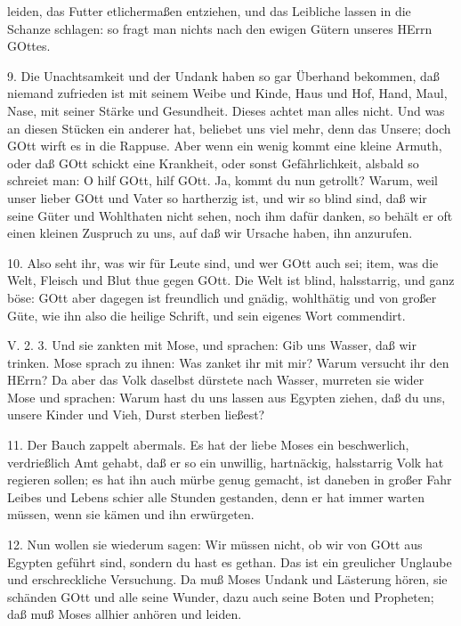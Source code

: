 leiden, das Futter etlichermaßen entziehen, und das Leibliche lassen in die Schanze schlagen: so fragt man nichts nach den ewigen Gütern unseres HErrn GOttes.

9. Die Unachtsamkeit und der Undank haben so gar Überhand bekommen, daß niemand zufrieden ist mit seinem Weibe und Kinde, Haus und Hof, Hand, Maul, Nase, mit seiner Stärke und Gesundheit. Dieses achtet man alles nicht. Und was an diesen Stücken ein anderer hat, beliebet uns viel mehr, denn das Unsere; doch GOtt wirft es in die Rappuse. Aber wenn ein wenig kommt eine kleine Armuth, oder daß GOtt schickt eine Krankheit, oder sonst Gefährlichkeit, alsbald so schreiet man: O hilf GOtt, hilf GOtt. Ja, kommt du nun getrollt? Warum, weil unser lieber GOtt und Vater so hartherzig ist, und wir so blind sind, daß wir seine Güter und Wohlthaten nicht sehen, noch ihm dafür danken, so behält er oft einen kleinen Zuspruch zu uns, auf daß wir Ursache haben, ihn anzurufen.

10. Also seht ihr, was wir für Leute sind, und wer GOtt auch sei; item, was die Welt, Fleisch und Blut thue gegen GOtt. Die Welt ist blind, halsstarrig, und ganz böse: GOtt aber dagegen ist freundlich und gnädig, wohlthätig und von großer Güte, wie ihn also die heilige Schrift, und sein eigenes Wort commendirt.

\begin{schriftzitat}
V. 2. 3. Und sie zankten mit Mose, und sprachen: Gib uns Wasser, daß wir trinken. Mose sprach zu ihnen: Was zanket ihr mit mir? Warum versucht ihr den HErrn? Da aber das Volk daselbst dürstete nach Wasser, murreten sie wider Mose und sprachen: Warum hast du uns lassen aus Egypten ziehen, daß du uns, unsere Kinder und Vieh, Durst sterben ließest?
\end{schriftzitat}

11. Der Bauch zappelt abermals. Es hat der liebe Moses ein beschwerlich, verdrießlich Amt gehabt, daß er so ein unwillig, hartnäckig, halsstarrig Volk hat regieren sollen; es hat ihn auch mürbe genug gemacht, ist daneben in großer Fahr Leibes und Lebens schier alle Stunden gestanden, denn er hat immer warten müssen, wenn sie kämen und ihn erwürgeten.

12. Nun wollen sie wiederum sagen: Wir müssen nicht, ob wir von GOtt aus Egypten geführt sind, sondern du hast es gethan. Das ist ein greulicher Unglaube und erschreckliche Versuchung. Da muß Moses Undank und Lästerung hören, sie schänden GOtt und alle seine
Wunder, dazu auch seine Boten und Propheten; daß muß Moses allhier anhören und leiden.

